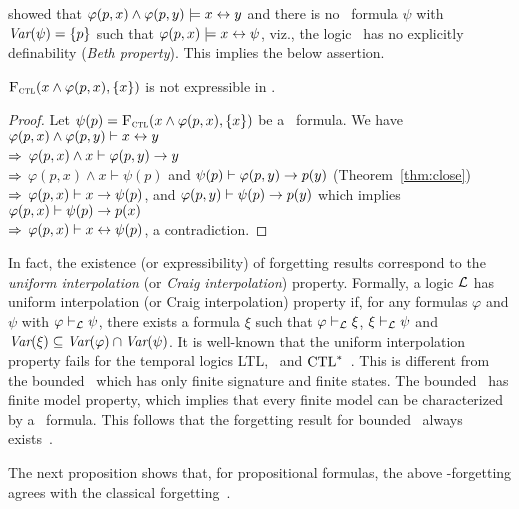 \documentclass[twoside,11pt]{article}
\begin{document}
\citeauthor{Maksimova:JANCL:1991} showed that $\varphi(p,x)\land \varphi(p,y)\models x\leftrightarrow y$ and there is
no \CTL\ formula $\psi$ with $\textit{Var}(\psi)=\{p\}$ such that
$\varphi(p,x)\models x\leftrightarrow \psi$, viz., the logic \CTL\ has no explicitly definability ({\em Beth property}). This implies the below
assertion.
\begin{proposition}
  ${\textsc{F}_{\textsc{ctl}}}(x\land \varphi(p,x), \{x\})$ is not expressible in \CTL.
\end{proposition}
\begin{proof}
Let $\psi(p)={\textsc{F}_{\textsc{ctl}}}(x\land \varphi(p,x), \{x\})$ be a \CTL\ formula.
We have \\
$\varphi(p,x)\land \varphi(p,y)\vdash x\leftrightarrow y$\\
$\Rightarrow$ $\varphi(p,x)\land x \vdash \varphi(p,y)\rightarrow y$\\
$\Rightarrow$ $\varphi(p,x)\land x\vdash \psi(p)$ and $\psi(p)\vdash \varphi(p,y)\rightarrow p(y)$ (Theorem~\ref{thm:close})\\
$\Rightarrow$ $\varphi(p,x)\vdash x\rightarrow\psi(p)$, and $\varphi(p,y)\vdash \psi(p)\rightarrow p(y)$ which implies $\varphi(p,x)\vdash \psi(p)\rightarrow p(x)$\\
$\Rightarrow$ $\varphi(p,x)\vdash x\leftrightarrow \psi(p)$, a contradiction.
\end{proof}

In fact, the existence (or expressibility) of forgetting results correspond to the {\em uniform interpolation} (or {\em Craig interpolation}) property.
Formally, a logic ${\cal L}$ has {uniform interpolation} (or {Craig interpolation}) property
if, for any formulas $\varphi$ and $\psi$ with $\varphi\vdash_{\cal L} \psi$, there exists a formula
$\xi$ such that $\varphi\vdash_{\cal L}\xi$, $\xi\vdash_{\cal L}\psi$ and $\textit{Var}(\xi)\subseteq \textit{Var}(\varphi)\cap \textit{Var}(\psi)$.
It is well-known that the uniform interpolation property fails for the temporal logics LTL, \CTL\  and $\textrm{CTL}^*$~\cite{Maksimova:JANCL:1991,DAgostino:synthese:2008}.
This is different from the bounded \CTL\ which has only finite signature and finite states.
The bounded \CTL\ has finite model property, which implies that every finite model can be characterized by a \CTL\ formula.
This follows that the forgetting result for bounded \CTL\ always exists~\cite{renyansfirstpaper}.

The  next proposition shows that, for propositional formulas, the above \CTL-forgetting agrees with the classical forgetting~\cite{lin1994forget}.
\end{document}
